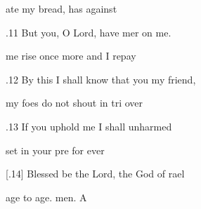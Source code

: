  ate my bread, has  against  

.11 But you, O Lord, have mer on me. 

 me rise once more and I  repay  

.12 By this I shall know that you  my friend, 

 my foes do not shout in tri over  

.13 If you uphold me I shall  unharmed 

 set in your pre for ever  

[.14] Blessed be the Lord, the God of rael 

 age to age. men. A 

